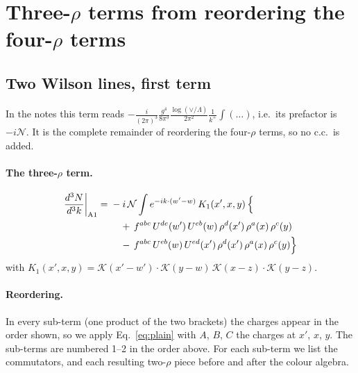 \documentclass[10pt]{article}
\numberwithin{equation}{section}
\newcommand{\KK}{\mathcal K}
\newcommand{\NN}{\mathcal N}
\begin{document}
\section{Three-$\rho$ terms from reordering the four-$\rho$ terms}\label{sec:fourrho}
\subsection{Two Wilson lines, first term}\label{sec:A1}
In the notes this term reads $-\frac{i}{(2\pi)^3}\frac{g^4}{8\pi^3}\frac{\log(\vee/\Lambda)}{2\pi^2}\frac1{k^+}\int(\dots)$, i.e.\ its prefactor is $-i\NN$. It is the complete remainder of reordering the four-$\rho$ terms, so no c.c.\ is added.
\paragraph{The three-$\rho$ term.}
\begin{align}
\frac{d^3N}{d^3k}\bigg|_{\rm A1}={}&-i\,\NN\int e^{-ik\cdot(w'-w)}\,K_1(x',x,y)\,\Big\{\notag\\
&\quad +\,f^{abc}\,U^{de}(w')\,U^{eb}(w)\,\rho^{d}(x')\,\rho^{a}(x)\,\rho^{c}(y)\notag\\
&\quad -\,f^{abc}\,U^{eb}(w)\,U^{ed}(x')\,\rho^{d}(x')\,\rho^{a}(x)\,\rho^{c}(y)\Big\}\label{eq:in-A1}
\end{align}
with $K_1(x',x,y)=\KK(x'-w')\cdot\KK(y-w)\,\KK(x-z)\cdot\KK(y-z)$.
\paragraph{Reordering.} In every sub-term (one product of the two brackets) the charges appear in the order shown, so we apply Eq.~\eqref{eq:plain} with $A$, $B$, $C$ the charges at $x'$, $x$, $y$. The sub-terms are numbered 1--2 in the order above. For each sub-term we list the commutators, and each resulting two-$\rho$ piece before and after the colour algebra.
\end{document}
